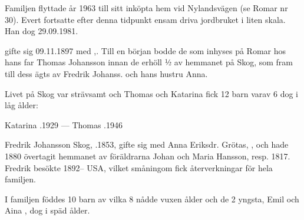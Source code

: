 Familjen flyttade år 1963 till sitt inköpta hem vid Nylandsvägen (se Romar nr 30). Evert fortsatte efter denna tidpunkt ensam driva jordbruket i liten skala. Han dog 29.09.1981.


 gifte sig 09.11.1897 med ,. Till en början bodde de som inhyses på Romar hos hans far Thomas Johansson innan de erhöll ½ av hemmanet på Skog, som fram till dess ägts av Fredrik Johanss. och hans hustru Anna.

Livet på Skog var strävsamt och Thomas och Katarina fick 12 barn varav 6 dog i låg ålder:
\begin{jhchildren}
  \item {}
  \item {}
  \item {}
  \item {}
  \item {}
  \item {}
  \item {}
  \item {}
  \item {}
  \item {}
  \item {}
  \item {}
\end{jhchildren}

Katarina .1929 --- Thomas .1946


Fredrik Johansson Skog, .1853, gifte sig med Anna Eriksdr. Grötas,  , och hade 1880 övertagit hemmanet av föräldrarna Johan och Maria Hansson,  resp. 1817. Fredrik besökte 1892-- USA, vilket småningom fick återverkningar för hela familjen.

I familjen föddes 10 barn av vilka 8 nådde vuxen ålder och de 2 yngsta, Emil  och Aina , dog i späd ålder.
\begin{jhchildren}
  \item {}
  \item {}
  \item {}
  \item {}
  \item {}
  \item {}
  \item {}
  \item {}
\end{jhchildren}

